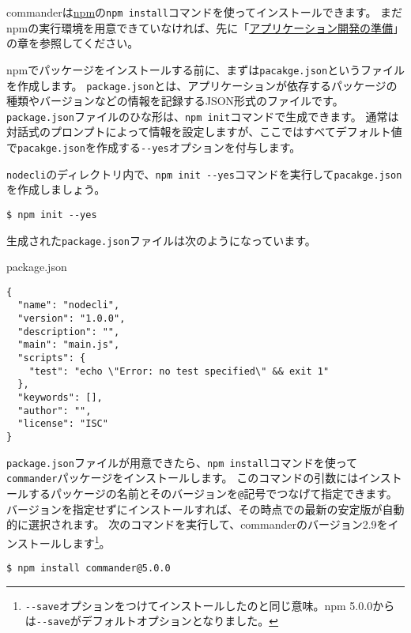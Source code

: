 commanderは\href{https://www.npmjs.com/}{npm}の\texttt{npm install}コマンドを使ってインストールできます。
まだnpmの実行環境を用意できていなければ、先に「\hyperlink{setup-local-env}{アプリケーション開発の準備}」の章を参照してください。

npmでパッケージをインストールする前に、まずは\texttt{pacakge.json}というファイルを作成します。
\texttt{package.json}とは、アプリケーションが依存するパッケージの種類やバージョンなどの情報を記録するJSON形式のファイルです。
\texttt{package.json}ファイルのひな形は、\texttt{npm init}コマンドで生成できます。
通常は対話式のプロンプトによって情報を設定しますが、ここではすべてデフォルト値で\texttt{pacakge.json}を作成する\texttt{-\/-yes}オプションを付与します。

\texttt{nodecli}のディレクトリ内で、\texttt{npm init -\/-yes}コマンドを実行して\texttt{pacakge.json}を作成しましょう。

\begin{lstlisting}
$ npm init --yes
\end{lstlisting}

生成された\texttt{package.json}ファイルは次のようになっています。

\begin{listtitle}
package.json
\end{listtitle}
\begin{lstlisting}
{
  "name": "nodecli",
  "version": "1.0.0",
  "description": "",
  "main": "main.js",
  "scripts": {
    "test": "echo \"Error: no test specified\" && exit 1"
  },
  "keywords": [],
  "author": "",
  "license": "ISC"
}
\end{lstlisting}
\listend

\texttt{package.json}ファイルが用意できたら、\texttt{npm install}コマンドを使って\texttt{commander}パッケージをインストールします。
このコマンドの引数にはインストールするパッケージの名前とそのバージョンを\texttt{@}記号でつなげて指定できます。
バージョンを指定せずにインストールすれば、その時点での最新の安定版が自動的に選択されます。
次のコマンドを実行して、commanderのバージョン2.9をインストールします\footnote{\texttt{-\/-save}オプションをつけてインストールしたのと同じ意味。npm
  5.0.0からは\texttt{-\/-save}がデフォルトオプションとなりました。}。

\begin{lstlisting}
$ npm install commander@5.0.0
\end{lstlisting}

